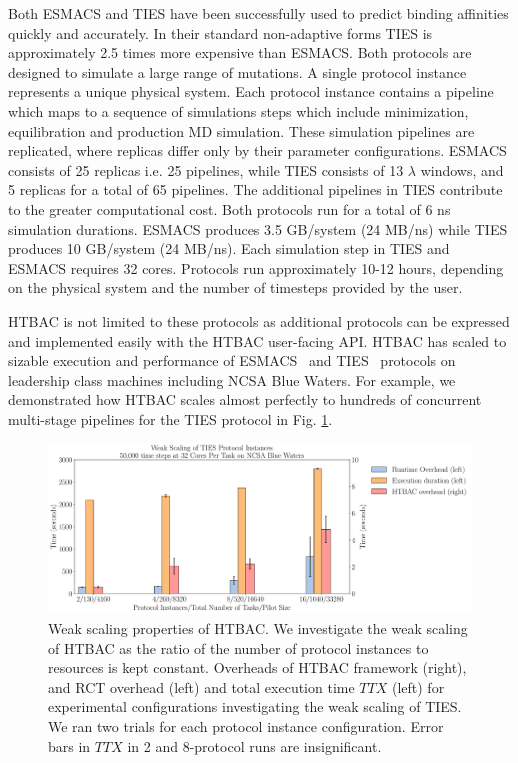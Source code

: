 \documentclass[conference]{IEEEtran}
\begin{document}
Both ESMACS and TIES have been successfully used to predict binding affinities
quickly and accurately. In their standard non-adaptive forms TIES is 
approximately 2.5 times more expensive than ESMACS. Both protocols are designed 
to simulate a large range of mutations. A single protocol instance represents a 
unique physical system. Each protocol instance contains a pipeline which maps to 
a sequence of simulations steps which include minimization, equilibration and
production MD simulation. These simulation pipelines are replicated, where
replicas differ only by their parameter configurations. ESMACS consists of 25 
replicas i.e. 25 pipelines, while TIES consists of 13 $\lambda$ windows, and 5 
replicas for a total of 65 pipelines. The additional pipelines in TIES 
contribute to the greater computational cost. Both protocols run for a total of 
6 ns simulation durations. 
ESMACS produces 3.5 GB/system (24 MB/ns) while TIES produces 10 GB/system 
(24 MB/ns). Each simulation step in TIES and ESMACS requires 32 cores. Protocols 
run approximately 10-12 hours, depending on the physical system and the number 
of timesteps provided by the user.

HTBAC is not limited to these protocols as additional protocols can be
expressed and implemented easily with the HTBAC user-facing API. HTBAC has
scaled to sizable execution and performance of ESMACS~\cite{dakka2017} and
TIES~\cite{dakka_farkaspall} protocols on leadership class machines including
NCSA Blue Waters. For example, we demonstrated how HTBAC scales almost
perfectly to hundreds of concurrent multi-stage pipelines for the TIES
protocol in Fig. \ref{fig:weak_scaling}.

\begin{figure}
  \centering
   \includegraphics[width=\columnwidth]
   {weak_scaling_TIES_instances_50,000_timesteps_with_16_instances.pdf}
  \caption{Weak scaling properties of HTBAC. We investigate the
  weak scaling of HTBAC as the ratio of the number of protocol instances to
  resources is kept constant. Overheads of HTBAC framework (right), and RCT overhead 
  (left) and total execution time \(TTX\) (left) for experimental configurations 
  investigating the weak scaling of TIES. We ran two trials for each protocol instance 
  configuration. Error bars in \(TTX\) in 2 and 8-protocol runs are 
  insignificant.}
\label{fig:weak_scaling}
\end{figure}
\end{document}
